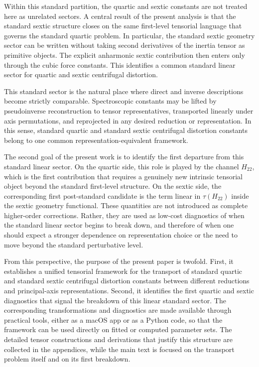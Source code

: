 \documentclass[journal=jacsat,manuscript=article]{achemso}
\begin{document}
Within this standard partition, the quartic and sextic constants are
not treated here as unrelated sectors. A central result of the present
analysis is that the standard sextic structure closes on the same
first-level tensorial language that governs the standard quartic
problem. In particular, the standard sextic geometry sector can be
written without taking second derivatives of the inertia tensor as
primitive objects. The explicit anharmonic sextic contribution then
enters only through the cubic force constants. This identifies a
common standard linear sector for quartic and sextic centrifugal
distortion.

This standard sector is the natural place where direct and inverse
descriptions become strictly comparable. Spectroscopic constants may
be lifted by pseudoinverse reconstruction to tensor representatives,
transported linearly under axis permutations, and reprojected in any
desired reduction or representation. In this sense, standard quartic
and standard sextic centrifugal distortion constants belong to one
common representation-equivalent framework.

The second goal of the present work is to identify the first departure
from this standard linear sector. On the quartic side, this role is
played by the channel $H_{22}$, which is the first contribution that
requires a genuinely new intrinsic tensorial object beyond the
standard first-level structure. On the sextic side, the corresponding
first post-standard candidate is the term linear in $\tau(H_{22})$
inside the sextic geometry functional. These quantities are not
introduced as complete higher-order corrections. Rather, they are used
as low-cost diagnostics of when the standard linear sector begins to
break down, and therefore of when one should expect a stronger
dependence on representation choice or the need to move beyond the
standard perturbative level.

From this perspective, the purpose of the present paper is twofold.
First, it establishes a unified tensorial framework for the transport
of standard quartic and standard sextic centrifugal distortion
constants between different reductions and principal-axis
representations. Second, it identifies the first quartic and sextic
diagnostics that signal the breakdown of this linear standard sector.
The corresponding transformations and diagnostics are made available
through practical tools, either as a macOS app or as a Python code,
so that the framework can be used directly on fitted or computed
parameter sets.
The detailed tensor constructions and derivations that justify this
structure are collected in the appendices, while the main text is
focused on the transport problem itself and on its first breakdown.
\end{document}

